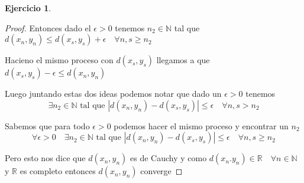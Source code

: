 \documentclass[12pt]{report}
\newcommand{\R}{\mathbb{R}}
\newcommand{\N}{\mathbb{N}}
\theoremstyle{definition}
\newtheorem{ej}{Ejercicio}
\begin{document}
\begin{ej}
\begin{enumerate}
\begin{proof}
	Entonces dado el $\epsilon >0$ tenemos $n_2 \in \N$ tal que $d(x_n,y_n) \leq d(x_s,y_s) + \epsilon \quad \forall n,s \geq n_2$

	Hacieno el mismo proceso con $d(x_s,y_s)$ llegamos a que $d(x_s,y_s) - \epsilon \leq d(x_n,y_n)$
      
     Luego juntando estas dos ideas podemos notar que dado un $\epsilon > 0$ tenemos
     $$\exists n_2 \in \N \text{ tal que } |d(x_n,y_n) - d(x_s,y_s)| \leq \epsilon \quad \forall n,s > n_2$$ 

   Sabemos que para todo $\epsilon > 0$ podemos hacer el mismo proceso y encontrar un $n_2$ 
 $$\forall \epsilon > 0 \quad \exists n_2 \in \N \text{ tal que } |d(x_n,y_n) - d(x_s,y_s)| \leq \epsilon \quad \forall n,s \geq n_2$$ 


     Pero esto nos dice que $d(x_n,y_n)$ es de Cauchy y como $d(x_n.y_n) \in \R \quad \forall n \in \N$ y $\R$ es completo entonces $d(x_n,y_n)$ converge

      \end{proof}
  \end{enumerate}
\end{ej}
\end{document}
